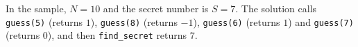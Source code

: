 In the sample, $N = 10$ and the secret number is $S = 7$. The solution calls
\texttt{guess(5)} (returns $1$), \texttt{guess(8)} (returns $-1$),
\texttt{guess(6)} (returns $1$) and \texttt{guess(7)} (returns $0$), and then
\texttt{find\_secret} returns $7$.
